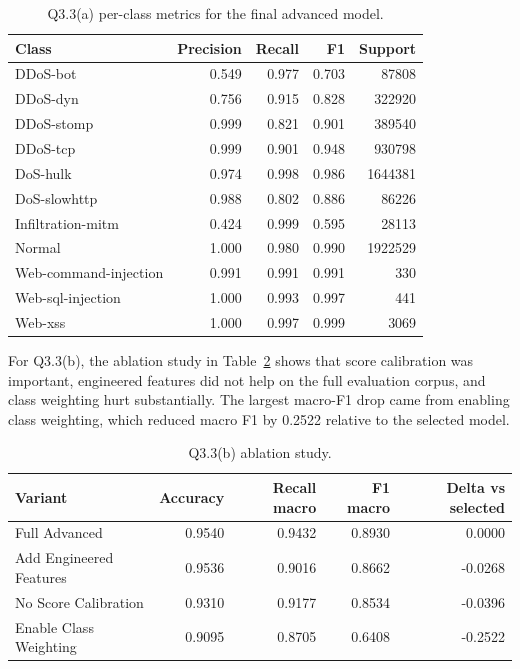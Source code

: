 \documentclass[journal,onecolumn]{IEEEtran}
\begin{document}
\begin{table}[H]
\caption{Q3.3(a) per-class metrics for the final advanced model.}
\label{tab:q3_advanced_perclass}
\centering
\small
\begin{tabular}{@{}lrrrr@{}}
\toprule
Class & Precision & Recall & F1 & Support \\
\midrule
DDoS-bot & 0.549 & 0.977 & 0.703 & 87808 \\
DDoS-dyn & 0.756 & 0.915 & 0.828 & 322920 \\
DDoS-stomp & 0.999 & 0.821 & 0.901 & 389540 \\
DDoS-tcp & 0.999 & 0.901 & 0.948 & 930798 \\
DoS-hulk & 0.974 & 0.998 & 0.986 & 1644381 \\
DoS-slowhttp & 0.988 & 0.802 & 0.886 & 86226 \\
Infiltration-mitm & 0.424 & 0.999 & 0.595 & 28113 \\
Normal & 1.000 & 0.980 & 0.990 & 1922529 \\
Web-command-injection & 0.991 & 0.991 & 0.991 & 330 \\
Web-sql-injection & 1.000 & 0.993 & 0.997 & 441 \\
Web-xss & 1.000 & 0.997 & 0.999 & 3069 \\
\bottomrule
\end{tabular}
\end{table}

For Q3.3(b), the ablation study in Table~\ref{tab:q3_ablation} shows that score calibration was important, engineered features did not help on the full evaluation corpus, and class weighting hurt substantially. The largest macro-F1 drop came from enabling class weighting, which reduced macro F1 by 0.2522 relative to the selected model.

\begin{table}[H]
\caption{Q3.3(b) ablation study.}
\label{tab:q3_ablation}
\centering
\small
\begin{tabular}{@{}lrrrr@{}}
\toprule
Variant & Accuracy & Recall macro & F1 macro & Delta vs selected \\
\midrule
Full Advanced & 0.9540 & 0.9432 & 0.8930 & 0.0000 \\
Add Engineered Features & 0.9536 & 0.9016 & 0.8662 & -0.0268 \\
No Score Calibration & 0.9310 & 0.9177 & 0.8534 & -0.0396 \\
Enable Class Weighting & 0.9095 & 0.8705 & 0.6408 & -0.2522 \\
\bottomrule
\end{tabular}
\end{table}
\end{document}
